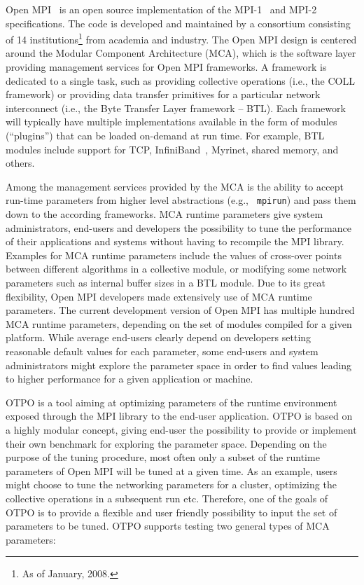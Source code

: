 Open MPI~\cite{gabriel:ompi} is an open source implementation of the
MPI-1~\cite{mpi1} and MPI-2~\cite{mpi2} specifications. The code is
developed and maintained by a consortium consisting of 14
institutions\footnote{As of January, 2008.} from academia and
industry. The Open MPI design is centered around the Modular Component
Architecture (MCA), which is the software layer providing management
services for Open MPI frameworks. A framework is dedicated to a single
task, such as providing collective operations (i.e., the COLL
framework) or providing data transfer primitives for a particular
network interconnect (i.e., the Byte Transfer Layer framework --
BTL). Each framework will typically have multiple implementations
available in the form of modules (``plugins'') that can be loaded
on-demand at run time.  For example, BTL modules include support for
TCP, InfiniBand~\cite{ib}, Myrinet, shared memory, and others.

Among the management services provided by the MCA is the ability to
accept run-time parameters from higher level abstractions (e.g., {\tt
  mpirun}) and pass them down to the according frameworks. MCA runtime
parameters give system administrators, end-users and developers the
possibility to tune the performance of their applications and systems
without having to recompile the MPI library. Examples for MCA runtime
parameters include the values of cross-over points between different
algorithms in a collective module, or modifying some network
parameters such as internal buffer sizes in a BTL module. Due to its
great flexibility, Open MPI developers made extensively use of MCA
runtime parameters.  The current development version of Open MPI has
multiple hundred MCA runtime parameters, depending on the set of
modules compiled for a given platform. While average end-users clearly
depend on developers setting reasonable default values for each
parameter, some end-users and system administrators might explore the
parameter space in order to find values leading to higher performance
for a given application or machine.

OTPO is a tool aiming at optimizing parameters of the runtime environment
exposed through the MPI library to the end-user application. OTPO is based on
a highly modular concept, giving end-user the possibility to provide or
implement their own benchmark for exploring the parameter space. Depending on
the purpose of the tuning procedure, most often only a subset of the runtime
parameters of Open MPI will be tuned at a given time. As an example, users
might choose to tune the networking parameters for a cluster, optimizing the
collective operations in a subsequent run etc. Therefore, one of the goals of
OTPO is to provide a flexible and user friendly possibility to input the set
of parameters to be tuned. 
OTPO supports testing two general types of MCA parameters:

